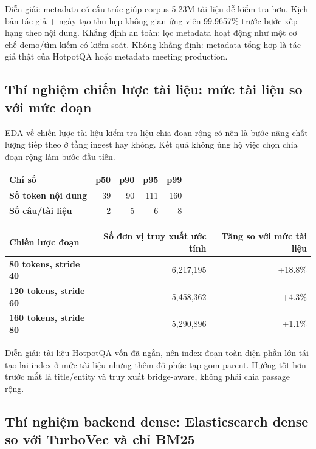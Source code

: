 \documentclass[11pt,a4paper]{article}
\begin{document}
Diễn giải: metadata có cấu trúc giúp corpus 5.23M tài liệu dễ kiểm tra hơn.
Kịch bản tác giả + ngày tạo thu hẹp không gian ứng viên 99.9657\% trước bước xếp hạng theo nội dung.
Khẳng định an toàn: lọc metadata hoạt động như một cơ chế demo/tìm kiếm có kiểm soát. Không khẳng định:
metadata tổng hợp là tác giả thật của HotpotQA hoặc metadata meeting production.

\subsection{Thí nghiệm chiến lược tài liệu: mức tài liệu so với mức đoạn}

EDA về chiến lược tài liệu kiểm tra liệu chia đoạn rộng có nên là bước nâng chất lượng tiếp theo
ở tầng ingest hay không. Kết quả không ủng hộ việc chọn chia đoạn rộng làm bước đầu tiên.

\begin{tabularx}{\textwidth}{>{\bfseries}p{} r r r r}
\toprule
Chỉ số & p50 & p90 & p95 & p99 \\
\midrule
Số token nội dung & 39 & 90 & 111 & 160 \\
Số câu/tài liệu & 2 & 5 & 6 & 8 \\
\bottomrule
\end{tabularx}

\vspace{0.5em}

\begin{tabularx}{\textwidth}{>{\bfseries}p{} r r}
\toprule
Chiến lược đoạn & Số đơn vị truy xuất ước tính & Tăng so với mức tài liệu \\
\midrule
80 tokens, stride 40 & 6,217,195 & +18.8\% \\
120 tokens, stride 60 & 5,458,362 & +4.3\% \\
160 tokens, stride 80 & 5,290,896 & +1.1\% \\
\bottomrule
\end{tabularx}

Diễn giải: tài liệu HotpotQA vốn đã ngắn, nên index đoạn toàn diện phần lớn tái tạo lại
index ở mức tài liệu nhưng thêm độ phức tạp gom parent. Hướng tốt hơn trước mắt là title/entity
và truy xuất bridge-aware, không phải chia passage rộng.

\subsection{Thí nghiệm backend dense: Elasticsearch dense so với TurboVec và chỉ BM25}
\end{document}

